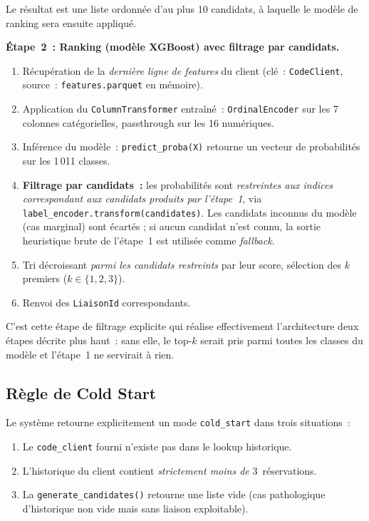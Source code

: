 \documentclass[11pt, a4paper]{article}
\begin{document}
Le résultat est une liste ordonnée d'au plus 10 candidats, à laquelle
le modèle de ranking sera ensuite appliqué.

\textbf{Étape~2~: Ranking (modèle XGBoost) avec filtrage par candidats.}
\begin{enumerate}
\item Récupération de la \textit{dernière ligne de features} du client
    (clé~: \texttt{CodeClient}, source~:
    \texttt{features.parquet} en mémoire).
\item Application du \texttt{ColumnTransformer} entraîné~:
    \texttt{OrdinalEncoder} sur les 7 colonnes catégorielles, passthrough
    sur les 16 numériques.
\item Inférence du modèle~: \texttt{predict\_proba(X)} retourne un
    vecteur de probabilités sur les 1\,011 classes.
\item \textbf{Filtrage par candidats~:} les probabilités sont
    \textit{restreintes aux indices correspondant aux candidats produits
    par l'étape~1}, via \texttt{label\_encoder.transform(candidates)}.
    Les candidats inconnus du modèle (cas marginal) sont écartés ; si
    aucun candidat n'est connu, la sortie heuristique brute de
    l'étape~1 est utilisée comme \textit{fallback}.
\item Tri décroissant \textit{parmi les candidats restreints} par leur
    score, sélection des $k$ premiers ($k \in \{1, 2, 3\}$).
\item Renvoi des \texttt{LiaisonId} correspondants.
\end{enumerate}

C'est cette étape de filtrage explicite qui réalise effectivement
l'architecture deux étapes décrite plus haut~: sans elle, le top-$k$
serait pris parmi toutes les classes du modèle et l'étape~1 ne
servirait à rien.

\subsection{Règle de Cold Start}

Le système retourne explicitement un mode \texttt{cold\_start} dans
trois situations~:
\begin{enumerate}
\item Le \texttt{code\_client} fourni n'existe pas dans le lookup
    historique.
\item L'historique du client contient \textit{strictement moins de}
    3~réservations.
\item La \texttt{generate\_candidates()} retourne une liste vide
    (cas pathologique d'historique non vide mais sans liaison
    exploitable).
\end{enumerate}
\end{document}
